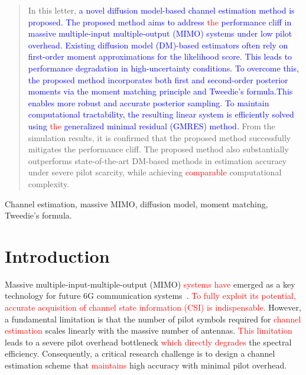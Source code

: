 \documentclass[lettersize,journal]{IEEEtran}
\newcommand{\tred}{\textcolor{red}}
\newcommand{\tblue}{\textcolor{blue}}
\begin{document}
\maketitle
\begin{abstract}
In this letter, \tblue{a novel diffusion model-based channel estimation method is proposed.} \tblue{The proposed method aims to address \tred{the} performance cliff in massive multiple-input multiple-output (MIMO) systems under low pilot overhead. Existing diffusion model (DM)-based estimators often rely on first-order moment approximations for the likelihood score. This leads to performance degradation in high-uncertainty conditions.} \tblue{To overcome this, the proposed method incorporates both first and second-order posterior moments via the moment matching principle and Tweedie's formula.This enables more robust and accurate posterior sampling.} \tblue{To maintain computational tractability, the resulting linear system is efficiently solved using \tred{the} generalized minimal residual (GMRES) method.} From the simulation results, it is confirmed that the proposed method successfully mitigates the performance cliff. The proposed method also substantially outperforms state-of-the-art DM-based methods in estimation accuracy under severe pilot scarcity, while achieving \tred{comparable} computational complexity.
\end{abstract}

\begin{IEEEkeywords}
Channel estimation, massive MIMO, diffusion model, moment matching, Tweedie's formula.
\end{IEEEkeywords}


\section{Introduction}

Massive multiple-input-multiple-output (MIMO) \tred{systems have} emerged as a key technology for future 6G communication systems~\cite{busariMillimeterWaveMassiveMIMO2018}. \tred{To fully exploit its potential, accurate acquisition of channel state information (CSI) is indispensable.} However, a fundamental limitation is that the number of pilot symbols required for \tred{channel estimation} scales linearly with the massive number of antennas. \tred{This limitation} leads to a severe pilot overhead bottleneck \tred{which directly degrades} the spectral efficiency. Consequently, a critical research challenge is to design a channel estimation scheme that \tred{maintains} high accuracy with minimal pilot overhead.
\end{document}
